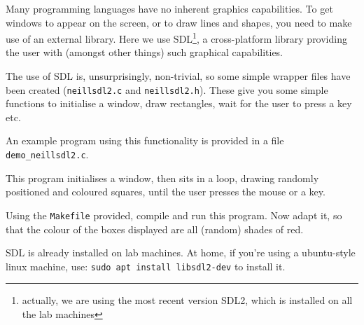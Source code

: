 
Many programming languages have no inherent graphics capabilities.
To get windows to appear on the screen, or to draw lines and shapes,
you need to make use of an external library. Here we use SDL\footnote{
actually, we are using the most recent version SDL2, which is installed
on all the lab machines}, a cross-platform library providing the user with
(amongst other things) such graphical capabilities.


The use of SDL is, unsurprisingly, non-trivial, so some simple wrapper
files have been created (\verb^neillsdl2.c^ and \verb^neillsdl2.h^).
These give you some simple functions to initialise a window, draw
rectangles, wait for the user to press a key etc.

An example program using this functionality is
provided in a file \verb^demo_neillsdl2.c^.

This program initialises a window, then sits in a loop, drawing
randomly positioned and coloured squares, until the
user presses the mouse or a key. 

\begin{exercise}
Using the \verb^Makefile^ provided, compile and run this program.
Now adapt it, so that the colour of the boxes displayed are all
(random) shades of red.

SDL is already installed on lab machines. At home, if you're using a
ubuntu-style linux machine, use: \verb^sudo apt install libsdl2-dev^
to install it.
\end{exercise}

